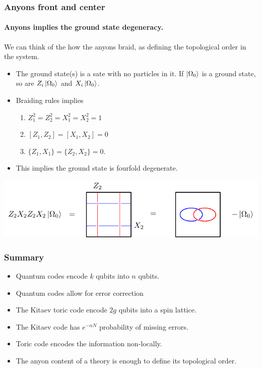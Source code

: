 \documentclass{beamer}
\renewcommand{\(}{\left(}
\renewcommand{\)}{\right)}
\renewcommand{\[}{\left[}
\renewcommand{\]}{\right]}
\begin{document}
\begin{frame}
    \frametitle{Anyons front and center}
    \framesubtitle{Anyons implies the ground state degeneracy.}

    \begin{framed}
        We can think of the how the anyons braid, as defining the topological order in the system.
    \end{framed}
    \begin{itemize}
        \item The ground state(s) is a sate with no particles in it. If $\ket{\Omega_0}$ is a ground state, so are $Z_i \ket{\Omega_0}$ and $X_i \ket{\Omega_0}$.
    \end{itemize}
    \begin{itemize}
        \item Braiding rules implies \begin{enumerate}
            \item $Z^2_1 = Z^2_2 = X^2_1 = X^2_2 = 1$
            \item $\[Z_1, Z_2 \] = \[X_1, X_2 \] = 0$
            \item $\{Z_1, X_1 \} = \{Z_2, X_2 \} = 0$.
        \end{enumerate}
        \item This implies the ground state is fourfold degenerate. 
    \end{itemize}
    \includegraphics[scale=0.9]{anyons_ground_state.pdf}
    
    
\end{frame}

\begin{frame}
    \frametitle{Summary}

    \begin{itemize}
        \item Quantum codes encode $k$ qubits into $n$ qubits. 
        \item Quantum codes allow for error correction 
        \item The Kitaev toric code encode $2g$ qubits into a spin lattice.  
        \item The Kitaev code has $e^{-\alpha N}$ probability of missing errors. 
        \item Toric code encodes the information non-locally. 
        \item The anyon content of a theory is enough to define its topological order.
    \end{itemize}

\end{frame}




\end{document}
